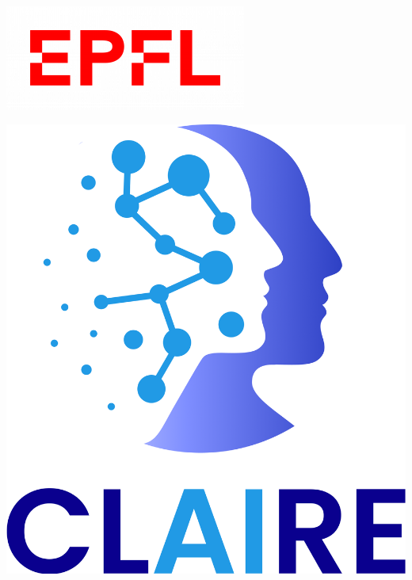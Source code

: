 \begin{titlepage}
\begin{center}
    
    \vspace*{1cm}
    \begin{minipage}{0.3\textwidth}
        \includegraphics[width=\textwidth]{figures/EPFL_Logo_Digital.png}
    \end{minipage}\hspace{1cm}
    \begin{minipage}{0.15\textwidth}
        \includegraphics[width=\textwidth]{figures/lab-logo.png}
    \end{minipage}


\end{center}
\end{titlepage}
